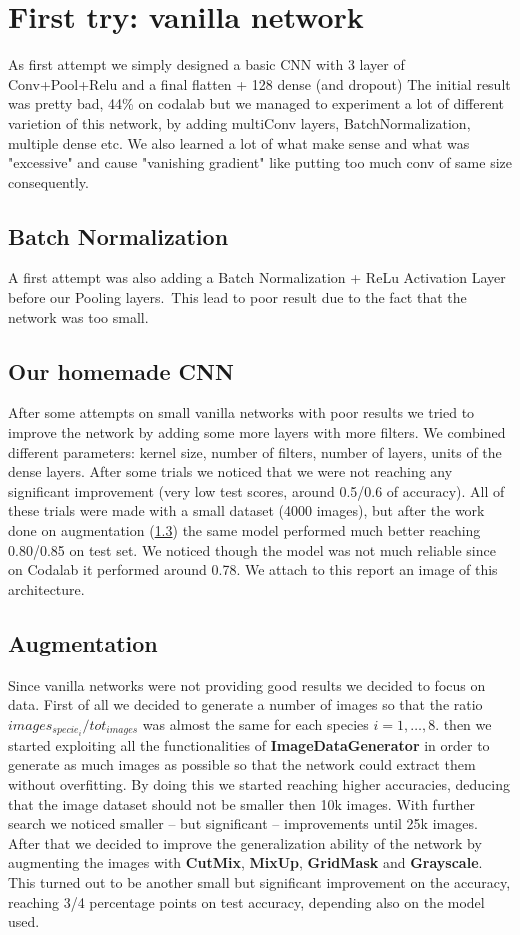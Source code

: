 \documentclass[10pt]{article}
\begin{document}
\section{First try: vanilla network}
As first attempt we simply designed a basic CNN with 3 layer of Conv+Pool+Relu and a final flatten + 128 dense (and dropout)
The initial result was pretty bad, 44\% on codalab but we managed to experiment a lot of different varietion of this network, by adding multiConv layers, BatchNormalization, multiple dense etc.
We also learned a lot of what make sense and what was "excessive" and cause "vanishing gradient" like putting too much conv of same size consequently.
\subsection{Batch Normalization}
A first attempt was also adding a Batch Normalization + ReLu Activation Layer before our Pooling layers.\
This lead to poor result due to the fact that the network was too small.

\subsection{Our homemade CNN}
After some attempts on small vanilla networks with poor results we tried to improve the network by adding some more layers with more filters.
We combined different parameters: kernel size, number of filters, number of layers, units of the dense layers.
After some trials we noticed that we were not reaching any significant improvement (very low test scores, around 0.5/0.6 of accuracy).
All of these trials were made with a small dataset (4000 images), but after the work done on augmentation (\ref{subsec:augmentation}) the same model performed much better reaching 0.80/0.85 on test set.
We noticed though the model was not much reliable since on Codalab it performed around 0.78.
We attach to this report an image of this architecture.

\subsection{Augmentation}\label{subsec:augmentation}
Since vanilla networks were not providing good results we decided to focus on data.
First of all we decided to generate a number of images so that the ratio $images_{specie_i}/tot_{images}$ was almost the same for each species $i=1,\dots,8$.
then we started exploiting all the functionalities of \textbf{ImageDataGenerator} in order to generate as much images as possible so that the network could extract them without overfitting.
By doing this we started reaching higher accuracies, deducing that the image dataset should not be smaller then 10k images.
With further search we noticed smaller -- but significant -- improvements until 25k images.
After that we decided to improve the generalization ability of the network by augmenting the images with \textbf{CutMix}, \textbf{MixUp}, \textbf{GridMask} and \textbf{Grayscale}.
This turned out to be another small but significant improvement on the accuracy, reaching 3/4 percentage points on test accuracy, depending also on the model used.
\end{document}
